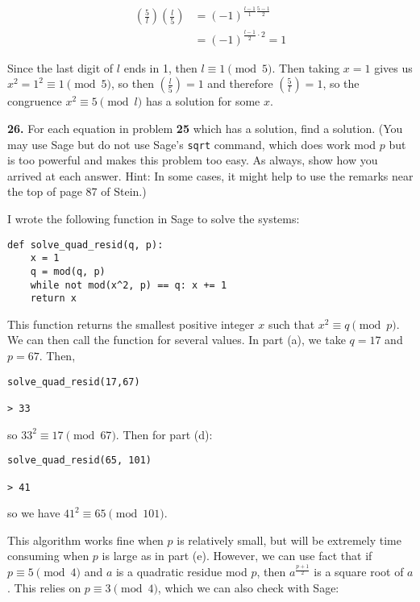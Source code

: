 \documentclass[12pt]{amsart}
\begin{document}
\begin{equation*}
\begin{split}
\left(\frac{5}{l} \right)\left(\frac{l}{5} \right) &= (-1)^{\frac{l-1}{1}\frac{5-1}{2}} \\
&=(-1)^{\frac{l-1}{2}\cdot 2}=1
\end{split}
\end{equation*}

Since the last digit of $l$ ends in 1, then $l \equiv 1\pmod{5}$. Then taking $x=1$ gives us $x^2=1^2\equiv 1\pmod{5}$, so then $(\frac{l}{5})=1$ and therefore $(\frac{5}{l})=1$, so the congruence $x^2\equiv 5\pmod{l}$ has a solution for some $x$.

\medskip

\newpage

{\bf 26.}  For each equation in problem {\bf 25} which has a solution, find a solution.  (You may use Sage but do not use Sage's {\tt sqrt} command, which does work mod $p$ but is too powerful and makes this problem too easy.  As always, show how you arrived at each answer.  Hint: In some cases, it might help to use the remarks near the top of page 87 of Stein.)

\medskip

I wrote the following function in Sage to solve the systems:

\begin{verbatim}
def solve_quad_resid(q, p):
    x = 1
    q = mod(q, p)
    while not mod(x^2, p) == q: x += 1
    return x
\end{verbatim}

This function returns the smallest positive integer $x$ such that $x^2 \equiv q\pmod{p}$. We can then call the function for several values. In part (a), we take $q = 17$ and $p = 67$. Then,

\begin{verbatim}
solve_quad_resid(17,67)

> 33
\end{verbatim}

so $33^2 \equiv 17\pmod{67}$. Then for part (d):

\begin{verbatim}
solve_quad_resid(65, 101)

> 41
\end{verbatim}

so we have $41^2 \equiv 65\pmod{101}$. 

This algorithm works fine when $p$ is relatively small, but will be extremely time consuming when $p$ is large as in part (e). However, we can use fact that if $p\equiv 5\pmod{4}$ and $a$ is a quadratic residue mod $p$, then $a^{\frac{p+1}{2}}$ is a square root of $a$. This relies on $p \equiv 3\pmod{4}$, which we can also check with Sage:
\end{document}
